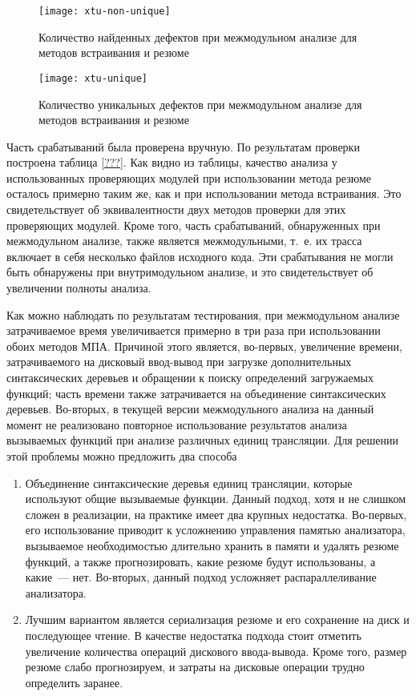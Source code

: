 \begin{figure}[h]
   \centering
   \texttt{[image: xtu-non-unique]}
   \caption{Количество найденных дефектов при межмодульном анализе для методов встраивания и резюме}\label{pic:xtu-non-unique}
\end{figure}


\begin{figure}[h]
   \centering
   \texttt{[image: xtu-unique]}
   \caption{Количество уникальных дефектов при межмодульном анализе для методов встраивания и резюме}\label{pic:xtu-unique}
\end{figure}

Часть срабатываний была проверена вручную. По результатам проверки построена таблица \ref{???}. Как видно из таблицы, качество анализа у использованных проверяющих модулей при использовании метода резюме осталось примерно таким же, как и при использовании метода встраивания. Это свидетельствует об эквивалентности двух методов проверки для этих проверяющих модулей. Кроме того, часть срабатываний, обнаруженных при межмодульном анализе, также является межмодульными, т.~е. их трасса включает в себя несколько файлов исходного кода. Эти срабатывания не могли быть обнаружены при внутримодульном анализе, и это свидетельствует об увеличении полноты анализа.


Как можно наблюдать по результатам тестирования, при межмодульном анализе затрачиваемое время увеличивается примерно в три раза при использовании обоих методов МПА. Причиной этого является, во-первых, увеличение времени, затрачиваемого на дисковый ввод-вывод при загрузке дополнительных синтаксических деревьев и обращении к поиску определений загружаемых функций; часть времени также затрачивается на объединение синтаксических деревьев. Во-вторых, в текущей версии межмодульного анализа на данный момент не реализовано повторное использование результатов анализа вызываемых функций при анализе различных единиц трансляции. Для решении этой проблемы можно предложить два способа
\begin{enumerate}
 \item Объединение синтаксические деревья единиц трансляции, которые используют общие вызываемые функции. Данный подход, хотя и не слишком сложен в реализации, на практике имеет два крупных недостатка. Во-первых, его использование приводит к усложнению управления памятью анализатора, вызываемое необходимостью длительно хранить в памяти и удалять резюме функций, а также прогнозировать, какие резюме будут использованы, а какие~--- нет. Во-вторых, данный подход усложняет распараллеливание анализатора.
 \item Лучшим вариантом является сериализация резюме и его сохранение на диск и последующее чтение. В качестве недостатка подхода стоит отметить увеличение количества операций дискового ввода-вывода. Кроме того, размер резюме слабо прогнозируем, и затраты на дисковые операции трудно определить заранее.
\end{enumerate}
